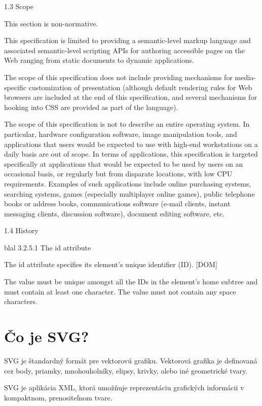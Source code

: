 1.3 Scope

This section is non-normative.

This specification is limited to providing a semantic-level markup language and associated semantic-level scripting APIs for authoring accessible pages on the Web ranging from static documents to dynamic applications.

The scope of this specification does not include providing mechanisms for media-specific customization of presentation (although default rendering rules for Web browsers are included at the end of this specification, and several mechanisms for hooking into CSS are provided as part of the language).

The scope of this specification is not to describe an entire operating system. In particular, hardware configuration software, image manipulation tools, and applications that users would be expected to use with high-end workstations on a daily basis are out of scope. In terms of applications, this specification is targeted specifically at applications that would be expected to be used by users on an occasional basis, or regularly but from disparate locations, with low CPU requirements. Examples of such applications include online purchasing systems, searching systems, games (especially multiplayer online games), public telephone books or address books, communications software (e-mail clients, instant messaging clients, discussion software), document editing software, etc.

1.4 History



blal 3.2.5.1 The id attribute

The id attribute specifies its element's unique identifier (ID). [DOM]

The value must be unique amongst all the IDs in the element's home subtree and must contain at least one character. The value must not contain any space characters.





\section{Čo je SVG?}
\ac{SVG} je štandardný formát pre vektorovú grafiku. Vektorová grafika je definovaná cez body, priamky, mnohouholníky, elipsy, krivky, alebo iné geometrické tvary.  

\acs{SVG} je aplikácia \ac*{XML}, ktorá umožňuje reprezentáciu grafických informácii v kompaktnom, prenositeľnom tvare. 


